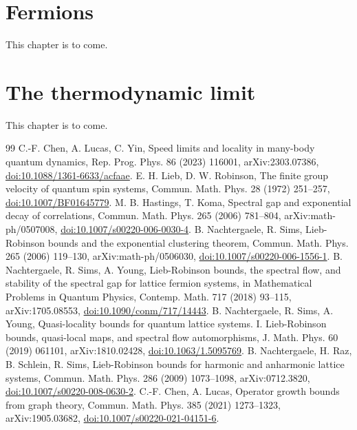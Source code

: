 \documentclass[11pt]{article}
\numberwithin{equation}{section}
\theoremstyle{definition}
\theoremstyle{remark}
\theoremstyle{plain}
\newcommand{\vetnew}[1]{#1}
\begin{document}
\clearpage




\FloatBarrier


\clearpage


\FloatBarrier


\section{Fermions}\label{sec:fermions}
\vetnew{This chapter is to come.}

\FloatBarrier


\section{The thermodynamic limit}\label{sec:limit}
\vetnew{This chapter is to come.}

\clearpage


\begin{thebibliography}{99}
 C.-F. Chen, A. Lucas, C. Yin, Speed limits and locality in many-body
quantum dynamics, Rep. Prog. Phys. 86 (2023) 116001, arXiv:2303.07386,
\href{https://doi.org/10.1088/1361-6633/acfaae}{doi:10.1088/1361-6633/acfaae}.
 E. H. Lieb, D. W. Robinson, The finite group velocity of quantum spin
systems, Commun. Math. Phys. 28 (1972) 251--257,
\href{https://doi.org/10.1007/BF01645779}{doi:10.1007/BF01645779}.
 M. B. Hastings, T. Koma, Spectral gap and exponential decay of
correlations, Commun. Math. Phys. 265 (2006) 781--804, arXiv:math-ph/0507008,
\href{https://doi.org/10.1007/s00220-006-0030-4}{doi:10.1007/s00220-006-0030-4}.
 B. Nachtergaele, R. Sims, Lieb-Robinson bounds and the exponential
clustering theorem, Commun. Math. Phys. 265 (2006) 119--130, arXiv:math-ph/0506030,
\href{https://doi.org/10.1007/s00220-006-1556-1}{doi:10.1007/s00220-006-1556-1}.
 B. Nachtergaele, R. Sims, A. Young, Lieb-Robinson bounds, the spectral flow,
and stability of the spectral gap for lattice fermion systems, in Mathematical Problems in Quantum
Physics, Contemp. Math. 717 (2018) 93--115, arXiv:1705.08553,
\href{https://doi.org/10.1090/conm/717/14443}{doi:10.1090/conm/717/14443}.
 B. Nachtergaele, R. Sims, A. Young, Quasi-locality bounds for quantum lattice
systems. I. Lieb-Robinson bounds, quasi-local maps, and spectral flow automorphisms, J. Math.
Phys. 60 (2019) 061101, arXiv:1810.02428,
\href{https://doi.org/10.1063/1.5095769}{doi:10.1063/1.5095769}.
 B. Nachtergaele, H. Raz, B. Schlein, R. Sims, Lieb-Robinson bounds for
harmonic and anharmonic lattice systems, Commun. Math. Phys. 286 (2009) 1073--1098,
arXiv:0712.3820,
\href{https://doi.org/10.1007/s00220-008-0630-2}{doi:10.1007/s00220-008-0630-2}.
 C.-F. Chen, A. Lucas, Operator growth bounds from graph theory, Commun.
Math. Phys. 385 (2021) 1273--1323, arXiv:1905.03682,
\href{https://doi.org/10.1007/s00220-021-04151-6}{doi:10.1007/s00220-021-04151-6}.
\end{thebibliography}


\end{document}
